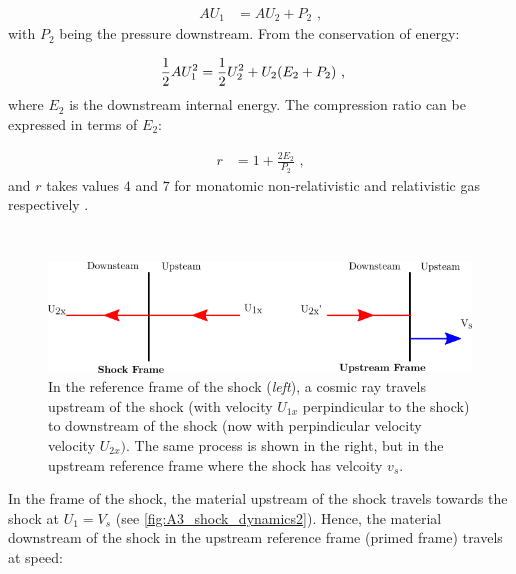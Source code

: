\begin{subequations}
    \begin{alignat}{1}
        AU_{1}&=AU_{2}+P_2\text{ ,}
    \end{alignat}
\end{subequations}
\noindent with $P_2$ being the pressure downstream. From the conservation of energy:

\begin{equation}
    \begin{aligned}
        \frac{1}{2}AU_{1}^2&=\frac{1}{2}U_{2}^2+U_{2}\qty(E_2+P_2)\text{ ,}
    \end{aligned}
\end{equation}
\noindent where $E_2$ is the downstream internal energy. The compression ratio can be expressed in terms of $E_2$:

\begin{equation}
    \begin{aligned}
        r&=1+\frac{2E_2}{P_2}\text{ ,}
    \end{aligned}
\end{equation}
\noindent and $r$ takes values $4$ and $7$ for monatomic non-relativistic and relativistic gas respectively  \citep{1983RPPh...46..973D}.
\par~\par 
\begin{figure}[h]
	\centering
	\includegraphics[width=1.0\textwidth]{A3_Diffusive_Shock_Acceleration/Images/upstream_downstream.png}
	\caption{In the reference frame of the shock (\textit{left}), a cosmic ray travels upstream of the shock (with velocity $U_{1x}$ perpindicular to the shock) to downstream of the shock (now with perpindicular velocity velocity $U_{2x})$. The same process is shown in the right, but in the upstream reference frame where the shock has velcoity $v_s$.}
	\label{fig:A3_shock_dynamics2}
\end{figure}

In the frame of the shock, the material upstream of the shock travels towards the shock at $U_1=V_s$ (see \autoref{fig:A3_shock_dynamics2}). Hence, the material downstream of the shock in the upstream reference frame (primed frame) travels at speed:

